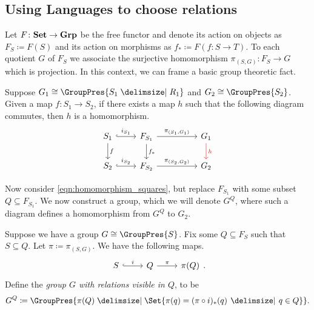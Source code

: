 
\subsection{Using Languages to choose relations}

Let $F \colon \mathbf{Set} \to \mathbf{Grp}$ be the free functor and denote its action on objects as $F_S \coloneqq F(S)$ and its action on morphisms as  $f_* \coloneqq F(f \colon S \to T)$.
To each quotient $G$ of $F_S$ we associate the surjective homomorphism $\pi_{(S,G)} \colon F_S \to G$ which is projection.
In this context, we can frame a basic group theoretic fact.

\begin{basic_fact}
	Suppose $G_1 \cong \GroupPres{S_1 \relations R_1}$ and $G_2 \cong \GroupPres{S_2}$.
	Given a map $f \colon S_1 \to S_2$, if there exists a map  $h$ such that the following diagram commutes, then $h$ is a homomorphism.
	\begin{equation}
		\begin{tikzcd}
			S_1 \ar[d, "f"] \ar[r, hook, "i_{S_1}"] & F_{S_1} \ar[d, "f_*"] \ar[rr, "\pi_{(S_1, G_1)}"] & & \ar[d, color=red, "h"] G_1 \\
			S_2 \ar[r, hook, "i_{S_2}"] & F_{S_2} \ar[rr, "\pi_{(S_2, G_2)}"] & & G_2
		\end{tikzcd}
		\label{eqn:homomorphism_squares}
	\end{equation}
	\label{thm:homomorphism_squares}
\end{basic_fact}

Now consider \eqref{eqn:homomorphism_squares}, but replace $F_{S_1}$ with some subset $Q \subseteq F_{S_1}$.
We now construct a group, which we will denote $G^Q$, where such a diagram defines a homomorphism from $G^Q$ to $G_2$.

\begin{definition}
	Suppose we have a group $G \cong \GroupPres{S}$.
	Fix some $Q \subseteq F_S$ such that $S \subseteq Q$.
	Let $\pi \coloneq \pi_{(S,G)}$.
	We have the following maps.
	\[
		\begin{tikzcd}
			S \ar[r, hook, "i"] & Q \ar[r, "\pi"] & \pi(Q)
		\end{tikzcd}
		.\]
	Define the \emph{group $G$ with relations visible in $Q$}, to be
	\[
		G^Q \coloneqq \GroupPres{\pi(Q) \relations \Set{\pi(q) = (\pi \circ i)_*(q) \given q \in Q} }
		.\]
	\label{def:G_Q}
\end{definition}


